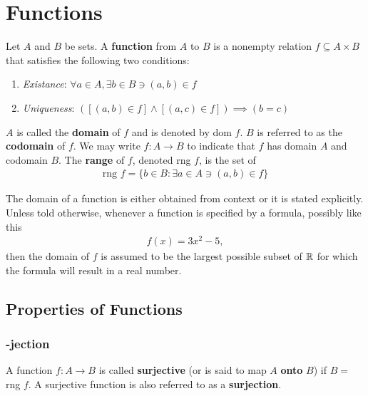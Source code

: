 \chapter{Functions}
\label{ChapterFunctions}

\begin{definition}
	Let $A$ and $B$ be sets. A \textbf{function} from $A$ to $B$ is a nonempty relation $f\subseteq A\times B$ that satisfies the following two conditions:
	\begin{enumerate}
		\item \textit{Existance}: $\forall a\in A, \exists b\in B \ni (a,b)\in f$
		\item \textit{Uniqueness}: $([(a,b)\in f] \land [(a,c)\in f]) \implies (b=c)$ 
	\end{enumerate}
	$A$ is called the \textbf{domain} of $f$ and is denoted by dom $f$. $B$ is referred to as the \textbf{codomain} of $f$. We may write $f:A\rightarrow B$ to indicate that $f$ has domain $A$ and codomain $B$. The \textbf{range} of $f$, denoted rng $f$, is the set of 
	\begin{align*}
		\text{rng } f = \{b\in B:\exists a\in A \ni (a,b)\in f\} 
	\end{align*}
\end{definition}

The domain of a function is either obtained from context or it is stated explicitly. Unless told otherwise, whenever a function is specified by a formula, possibly like this
\begin{align*}
	f(x) = 3x^2-5,
\end{align*}
then the domain of $f$ is assumed to be the largest possible subset of $\mathbb{R}$ for which the formula will result in a real number.

\newpage
\section{Properties of Functions}

\subsection{-jection}
\begin{definition}[Surjection]
	A function $f:A\rightarrow B$ is called \textbf{surjective} (or is said to map $A$ \textbf{onto} $B$) if $B=$ rng $f$. A surjective function is also referred to as a \textbf{surjection}.
\end{definition}

